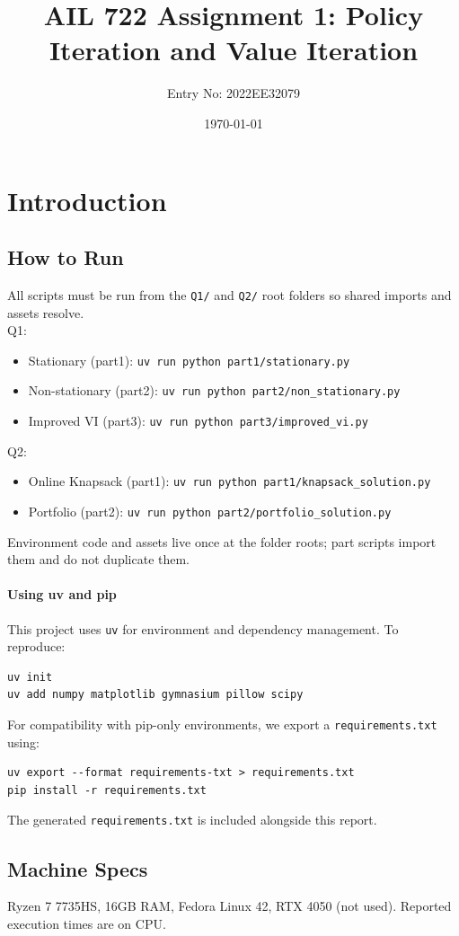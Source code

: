 \documentclass[12pt]{article}
\title{AIL 722 Assignment 1: Policy Iteration and Value Iteration}
\author{Entry No: 2022EE32079}
\date{\today}
\begin{document}
\maketitle

\section{Introduction}
\subsection*{How to Run}
All scripts must be run from the \texttt{Q1/} and \texttt{Q2/} root folders so shared imports and assets resolve.
\\Q1:
\begin{itemize}
  \item Stationary (part1): \texttt{uv run python part1/stationary.py}
  \item Non-stationary (part2): \texttt{uv run python part2/non\_stationary.py}
  \item Improved VI (part3): \texttt{uv run python part3/improved\_vi.py}
\end{itemize}
Q2:
\begin{itemize}
  \item Online Knapsack (part1): \texttt{uv run python part1/knapsack\_solution.py}
  \item Portfolio (part2): \texttt{uv run python part2/portfolio\_solution.py}
\end{itemize}
Environment code and assets live once at the folder roots; part scripts import them and do not duplicate them.

\paragraph{Using uv and pip}
This project uses \texttt{uv} for environment and dependency management. To reproduce:
\begin{verbatim}
uv init
uv add numpy matplotlib gymnasium pillow scipy
\end{verbatim}
For compatibility with pip-only environments, we export a \texttt{requirements.txt} using:
\begin{verbatim}
uv export --format requirements-txt > requirements.txt
pip install -r requirements.txt
\end{verbatim}
The generated \texttt{requirements.txt} is included alongside this report.

\subsection*{Machine Specs}
Ryzen 7 7735HS, 16GB RAM, Fedora Linux 42, RTX 4050 (not used). Reported execution times are on CPU.
\end{document}
